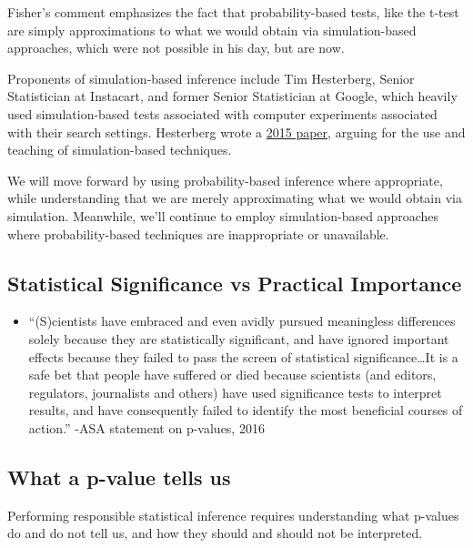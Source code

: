 \documentclass[
  letterpaper,
  DIV=11,
  numbers=noendperiod]{scrreprt}
\providecommand{\tightlist}{%
  \setlength{\itemsep}{0pt}\setlength{\parskip}{0pt}}\usepackage{longtable,booktabs,array}
\begin{document}
Fisher's comment emphasizes the fact that probability-based tests, like
the t-test are simply approximations to what we would obtain via
simulation-based approaches, which were not possible in his day, but are
now.

Proponents of simulation-based inference include Tim Hesterberg, Senior
Statistician at Instacart, and former Senior Statistician at Google,
which heavily used simulation-based tests associated with computer
experiments associated with their search settings. Hesterberg wrote a
\href{https://browse.arxiv.org/pdf/1411.5279.pdf}{2015 paper}, arguing
for the use and teaching of simulation-based techniques.

We will move forward by using probability-based inference where
appropriate, while understanding that we are merely approximating what
we would obtain via simulation. Meanwhile, we'll continue to employ
simulation-based approaches where probability-based techniques are
inappropriate or unavailable.

\subsection{Statistical Significance vs Practical
Importance}\label{statistical-significance-vs-practical-importance-1}

\begin{itemize}
\tightlist
\item
  ``(S)cientists have embraced and even avidly pursued meaningless
  differences solely because they are statistically significant, and
  have ignored important effects because they failed to pass the screen
  of statistical significance\ldots It is a safe bet that people have
  suffered or died because scientists (and editors, regulators,
  journalists and others) have used significance tests to interpret
  results, and have consequently failed to identify the most beneficial
  courses of action.'' -ASA statement on p-values, 2016
\end{itemize}

\subsection{What a p-value tells us}\label{what-a-p-value-tells-us-1}

Performing responsible statistical inference requires understanding what
p-values do and do not tell us, and how they should and should not be
interpreted.
\end{document}
